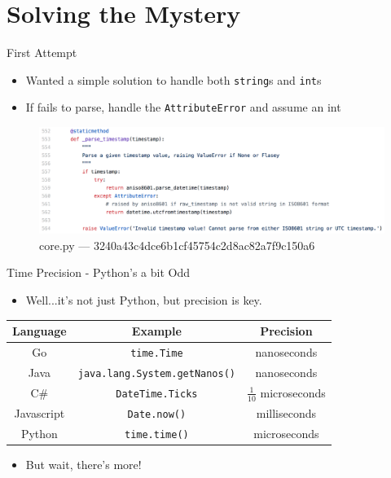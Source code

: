 \documentclass[10pt]{beamer}
\begin{document}
\section{Solving the Mystery}
\begin{frame}{First Attempt}
	\begin{itemize}
		\item Wanted a simple solution to handle both \texttt{string}s and \texttt{int}s
		\item If fails to parse, handle the \texttt{AttributeError} and assume an int
	\end{itemize}
	\begin{figure}
		\centering
		\includegraphics[width=\textwidth]{images/commit1.png}
		\caption{core.py --- 3240a43c4dce6b1cf45754c2d8ac82a7f9c150a6}
	\end{figure}
\end{frame}

\renewcommand{\arraystretch}{1.5}
\begin{frame}{Time Precision - Python's a bit Odd}
	\begin{itemize}
		\item Well...it's not just Python, but precision is key.
	\end{itemize}
	\begin{center}
		\begin{tabular}{ c c c }
			Language & Example & Precision \\
			\hline
			Go & \texttt{time.Time} & nanoseconds \\
			Java & \texttt{java.lang.System.getNanos()} & nanoseconds \\
			C\# & \texttt{DateTime.Ticks} & \(\frac{1}{10}\) microseconds \\
			Javascript & \texttt{Date.now()} & milliseconds \\
			Python & \texttt{time.time()} & microseconds
		\end{tabular}
	\end{center}
	\begin{itemize}
		\item But wait, there's more!
	\end{itemize}
\end{frame}
\end{document}
